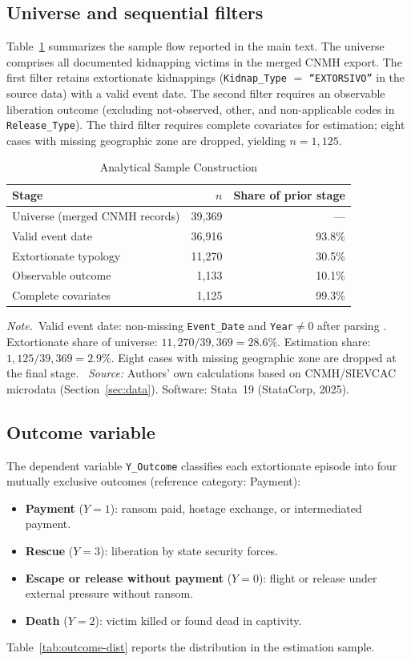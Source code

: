 \documentclass[ecta,nameyear,final,supplement]{econsocart}
\numberwithin{equation}{section}
\numberwithin{table}{section}
\newcommand{\tabnote}{\par\addvspace{0.4em}\noindent\emph{Note.}}
\newcommand{\tabsource}{\ \textit{Source:} Authors' own calculations based on
CNMH/SIEVCAC microdata (Section~\ref{sec:data}). Software: Stata~19
(StataCorp, 2025).}
\begin{document}
\subsection{Universe and sequential filters}

Table~\ref{tab:sample-flow} summarizes the sample flow reported in the main
text. The universe comprises all documented kidnapping victims in the merged
CNMH export. The first filter retains extortionate kidnappings
(\texttt{Kidnap\_Type} $=$ \texttt{``EXTORSIVO''} in the source data) with a valid event date. The second
filter requires an observable liberation outcome (excluding not-observed,
other, and non-applicable codes in \texttt{Release\_Type}). The third
filter requires complete covariates for estimation; eight cases with missing
geographic zone are dropped, yielding $n=1{,}125$.

\begin{table}[t]
\centering
\caption{Analytical Sample Construction}
\label{tab:sample-flow}
\begin{tabular}{@{}lrr@{}}
\toprule
Stage & $n$ & Share of prior stage \\
\midrule
Universe (merged CNMH records) & 39,369 & --- \\
Valid event date & 36,916 & 93.8\% \\
Extortionate typology & 11,270 & 30.5\% \\
Observable outcome & 1,133 & 10.1\% \\
Complete covariates & 1,125 & 99.3\% \\
\bottomrule
\end{tabular}
\tabnote\ Valid event date: non-missing \texttt{Event\_Date} and \texttt{Year}$\neq 0$
after parsing . Extortionate share of universe:
$11{,}270/39{,}369=28.6\%$. Estimation share: $1{,}125/39{,}369=2.9\%$. Eight
cases with missing geographic zone are dropped at the final stage.
\tabsource
\end{table}

\subsection{Outcome variable}

The dependent variable \texttt{Y\_Outcome} classifies each extortionate
episode into four mutually exclusive outcomes (reference category: Payment):
\begin{itemize}
\item \textbf{Payment} ($Y=1$): ransom paid, hostage exchange, or
  intermediated payment.
\item \textbf{Rescue} ($Y=3$): liberation by state security forces.
\item \textbf{Escape or release without payment} ($Y=0$):
  flight or release under external pressure without ransom.
\item \textbf{Death} ($Y=2$): victim killed or found dead in captivity.
\end{itemize}
Table~\ref{tab:outcome-dist} reports the distribution in the estimation
sample.
\end{document}
